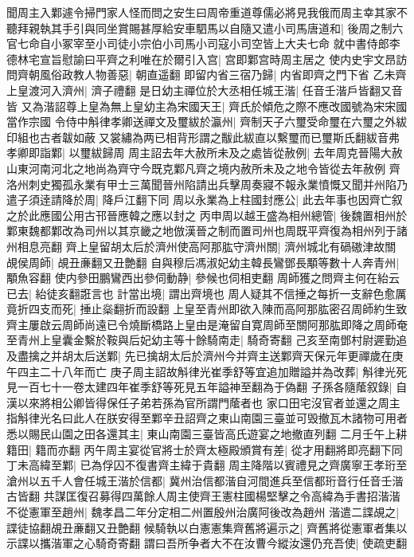 聞周主入鄴遽令掃門家人怪而問之安生曰周帝重道尊儒必將見我俄而周主幸其家不聽拜親執其手引與同坐賞賜甚厚給安車駟馬以自隨又遣小司馬唐道和|{
	後周之制六官七命自小冢宰至小司徒小宗伯小司馬小司寇小司空皆上大夫七命}
就中書侍郎李德林宅宣旨慰諭曰平齊之利唯在於爾引入宫|{
	宫即鄴宫時周主居之}
使内史宇文昂訪問齊朝風俗政教人物善惡|{
	朝直遥翻}
即留内省三宿乃歸|{
	内省即齊之門下省}
乙未齊上皇渡河入濟州|{
	濟子禮翻}
是日幼主禪位於大丞相任城王湝|{
	任音壬湝戶皆翻又音皆}
又為湝詔尊上皇為無上皇幼主為宋國天王|{
	齊氏於傾危之際不應改國號為宋宋國當作宗國}
令侍中斛律孝卿送禪文及璽紱於瀛州|{
	齊制天子六璽受命璽在六璽之外紱印組也古者韍如蔽又裳繡為两已相背形謂之黻此紱直以繫璽而已璽斯氏翻紱音弗}
孝卿即詣鄴|{
	以璽紱歸周}
周主詔去年大赦所未及之處皆從赦例|{
	去年周克晉陽大赦山東河南河北之地尚為齊守今既克鄴凡齊之境内赦所未及之地令皆從去年赦例}
齊洛州刺史獨孤永業有甲士三萬聞晉州陷請出兵擊周奏寢不報永業憤慨又聞并州陷乃遣子須逹請降於周|{
	降戶江翻下同}
周以永業為上柱國封應公|{
	此去年事也因齊亡叙之於此應國公用古邗晉應韓之應以封之}
丙申周以越王盛為相州總管|{
	後魏置相州於鄴東魏都鄴改為司州以其京畿之地倣漢晉之制而置司州也周既平齊復為相州列于諸州相息亮翻}
齊上皇留胡太后於濟州使高阿那肱守濟州關|{
	濟州城北有碢磝津故關}
覘侯周師|{
	覘丑亷翻又丑艶翻}
自與穆后馮淑妃幼主韓長鸞鄧長顒等數十人奔青州|{
	顒魚容翻}
使内參田鵬鸞西出參伺動静|{
	參候也伺相吏翻}
周師獲之問齊主何在紿云已去|{
	紿徒亥翻誑言也}
計當出境|{
	謂出齊境也}
周人疑其不信捶之每折一支辭色愈厲竟折四支而死|{
	捶止橤翻折而設翻}
上皇至青州即欲入陳而高阿那肱密召周師約生致齊主屢啟云周師尚遠已令燒斷橋路上皇由是淹留自寛周師至關阿那肱即降之周師奄至青州上皇囊金繫於鞍與后妃幼主等十餘騎南走|{
	騎奇寄翻}
己亥至南鄧村尉遲勤追及盡擒之并胡太后送鄴|{
	先已擒胡太后於濟州今并齊主送鄴齊天保元年更禪歲在庚午四主二十八年而亡}
庚子周主詔故斛律光崔季舒等宜追加贈謚并為改葬|{
	斛律光死見一百七十一卷太建四年崔季舒等死見五年謚神至翻為于偽翻}
子孫各隨䕃叙錄|{
	自漢以來將相公卿皆得保任子弟若孫為官所謂門䕃者也}
家口田宅沒官者並還之周主指斛律光名曰此人在朕安得至鄴辛丑詔齊之東山南園三臺並可毁撤瓦木諸物可用者悉以賜民山園之田各還其主|{
	東山南園三臺皆高氏遊宴之地撤直列翻}
二月壬午上耕籍田|{
	籍而亦翻}
丙午周主宴從官將士於齊太極殿頒賞有差|{
	從才用翻將即亮翻下同}
丁未高緯至鄴|{
	已為俘囚不復書齊主緯于貴翻}
周主降階以賓禮見之齊廣寧王孝珩至滄州以五千人會任城王湝於信都|{
	冀州治信都湝自河間進兵至信都珩音行任音壬湝古皆翻}
共謀匡復召募得四萬餘人周主使齊王憲柱國楊堅擊之令高緯為手書招湝湝不從憲軍至趙州|{
	魏孝昌二年分定相二州置殷州治廣阿後改為趙州}
湝遣二諜覘之|{
	諜徒協翻覘丑亷翻又丑艶翻}
候騎執以白憲憲集齊舊將遍示之|{
	齊舊將從憲軍者集以示諜以攜湝軍之心騎奇寄翻}
謂曰吾所争者大不在汝曹今縱汝還仍充吾使|{
	使疏吏翻}
